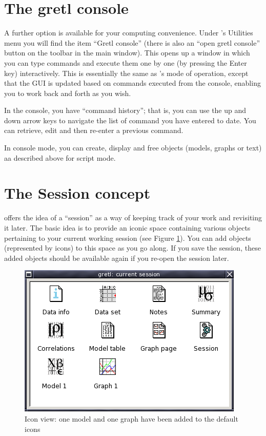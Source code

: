 \section{The gretl console}
\label{console}

A further option is available for your computing convenience. Under
's Utilities menu you will find the item ``Gretl console''
(there is also an ``open gretl console'' button on the toolbar in the
main window).  This opens up a window in which you can type commands
and execute them one by one (by pressing the Enter key) interactively.
This is essentially the same as 's mode of operation,
except that the GUI is updated based on commands executed from the
console, enabling you to work back and forth as you wish.

In the console, you have ``command history''; that is, you can use the
up and down arrow keys to navigate the list of command you have
entered to date.  You can retrieve, edit and then re-enter a previous
command.

In console mode, you can create, display and free objects (models,
graphs or text) aa described above for script mode.

\section{The Session concept}
\label{session}

 offers the idea of a ``session'' as a way of keeping track
of your work and revisiting it later. The basic idea is to provide an
iconic space containing various objects pertaining to your current
working session (see Figure \ref{fig-session}).  You can add objects
(represented by icons) to this space as you go along.  If you save the
session, these added objects should be available again if you re-open
the session later.

\begin{figure}[htbp]
  \begin{center}
    \includegraphics[scale=0.5]{figures/session}
  \end{center}
  \caption{Icon view: one model and one graph have been added to the
    default icons}
  \label{fig-session}
\end{figure}

